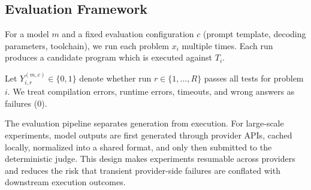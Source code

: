\documentclass[11pt]{article}
\begin{document}
\begin{table}[t]
\centering
\small
\caption{Models evaluated in this study, grouped by provider family. $\dagger$ denotes reasoning-specialized models.}
\label{tab:models}
\end{table}

\subsection{Evaluation Framework}
For a model $m$ and a fixed evaluation configuration $c$ (prompt template, decoding parameters, toolchain), we run each problem $x_i$ multiple times. Each run produces a candidate program which is executed against $T_i$.

Let $Y_{i,r}^{(m,c)} \in \{0,1\}$ denote whether run $r \in \{1,\dots,R\}$ passes all tests for problem $i$. We treat compilation errors, runtime errors, timeouts, and wrong answers as failures ($0$).

The evaluation pipeline separates generation from execution. For large-scale experiments, model outputs are first generated through provider APIs, cached locally, normalized into a shared format, and only then submitted to the deterministic judge. This design makes experiments resumable across providers and reduces the risk that transient provider-side failures are conflated with downstream execution outcomes.
\end{document}
